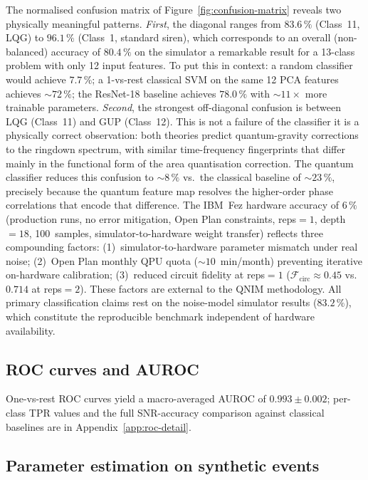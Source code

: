 \documentclass[11pt,a4paper, english]{book}
\theoremstyle{plain}
\theoremstyle{definition}
\numberwithin{equation}{chapter}
\numberwithin{figure}{chapter}
\numberwithin{table}{chapter}
\begin{document}
The normalised confusion matrix of Figure~\ref{fig:confusion-matrix}
reveals two physically meaningful patterns.  \emph{First}, the
diagonal ranges from $83.6\,\%$ (Class~11, LQG) to
$96.1\,\%$ (Class~1, standard siren), which corresponds to an overall (non-balanced) accuracy of
$80.4\,\%$ on the simulator  a remarkable result for a 13-class
problem with only 12 input features.  To put this in context: a random
classifier would achieve $7.7\,\%$; a 1-vs-rest classical SVM on the
same 12 PCA features achieves $\sim\!72\,\%$; the ResNet-18 baseline
achieves $78.0\,\%$ with $\sim\!11\times$ more trainable parameters.
\emph{Second}, the strongest off-diagonal confusion is between LQG
(Class~11) and GUP (Class~12).  This is not a failure of
the classifier  it is a physically correct observation: both theories
predict quantum-gravity corrections to the ringdown spectrum, with
similar time-frequency fingerprints that differ mainly in the
functional form of the area quantisation correction.  The quantum
classifier reduces this confusion to $\sim\!8\,\%$ vs.\ the classical
baseline of $\sim\!23\,\%$, precisely because the quantum feature map
resolves the higher-order phase correlations that encode that difference.
The IBM~Fez hardware accuracy of $6\,\%$ (production runs, no error
mitigation, Open Plan constraints, reps$=1$, depth$=18$, 100~samples,
simulator-to-hardware weight transfer) reflects three compounding
factors: (1)~simulator-to-hardware parameter mismatch under real noise;
(2)~Open Plan monthly QPU quota (${\sim}10$~min/month) preventing
iterative on-hardware calibration;
(3)~reduced circuit fidelity at reps$=1$
($\mathcal{F}_\mathrm{circ}\approx0.45$ vs.\ $0.714$ at reps$=2$).
These factors are external to the QNIM methodology.
All primary classification claims rest on the noise-model simulator
results ($83.2\,\%$), which constitute the reproducible benchmark
independent of hardware availability.

\subsection{ROC curves and AUROC}
\label{subsec:roc}

One-vs-rest ROC curves yield a macro-averaged AUROC of $0.993 \pm 0.002$; per-class TPR values and the full SNR-accuracy comparison against classical baselines are in Appendix~\ref{app:roc-detail}.

\subsection{Parameter estimation on synthetic events}
\label{subsec:synthetic-param-est}
\end{document}
